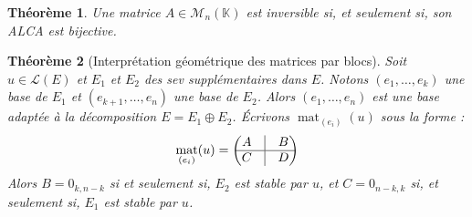\documentclass[french]{book}
\newcommand{\K}{\mathbb{K}}
\theoremstyle{plain}
\newtheorem{thm}{Théorème}[chapter]
\theoremstyle{definition}
\theoremstyle{remark}
\DeclareMathOperator{\mat}{mat}
\begin{document}
\begin{thm}
	Une matrice $A\in\mathcal{M}_n(\K)$ est inversible si, et seulement si, son ALCA est bijective.
\end{thm}
\begin{thm}[Interprétation géométrique des matrices par blocs]
	Soit $u\in\mathcal{L}(E)$ et $E_1$ et $E_2$ des sev supplémentaires dans $E$. Notons $(e_1,\ldots,e_k)$ une base de $E_1$ et $(e_{k+1},\ldots,e_n)$ une base de $E_2$. Alors $(e_1,\ldots,e_n)$ est une base adaptée à la décomposition $E=E_1\oplus E_2$. Écrivons $\mat_{(e_i)}(u)$ sous la forme : $$\mat_{(e_i)}(u)=\begin{pmatrix}A&\vline&B\\ \hline C&\vline&D\end{pmatrix}$$ Alors $B=0_{k,n-k}$ si et seulement si, $E_2$ est stable par $u$, et $C=0_{n-k,k}$ si, et seulement si, $E_1$ est stable par $u$.
\end{thm}
\end{document}
